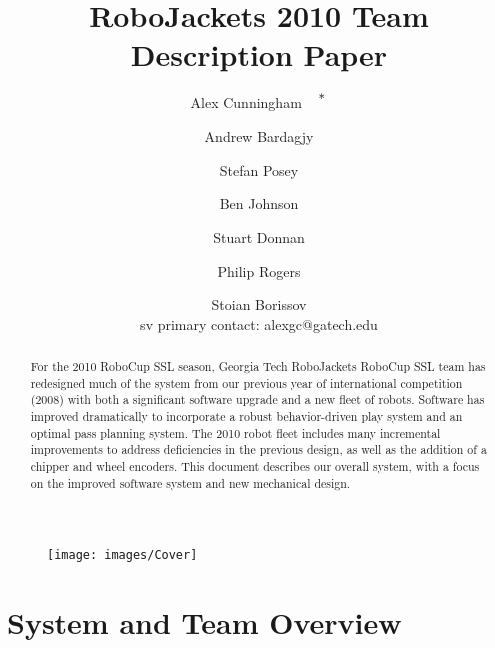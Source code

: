 \documentclass{llncs}
\title{RoboJackets 2010 Team Description Paper}
\author
{
Alex Cunningham  $^{\textrm{{\small *}}}$ \and
Andrew Bardagjy \and
Stefan Posey \and 
Ben Johnson \and
Stuart Donnan \and
Philip Rogers \and
Stoian Borissov
\\ sv
{\small * primary contact: alexgc@gatech.edu}
}
\institute{RoboJackets - www.robojackets.org \\ Georgia Institute of Technology - Atlanta, Georgia, USA.}
\begin{document}
\maketitle

\begin{figure} 
	\centering
	\vspace {0 cm}
 	\texttt{[image: images/Cover]}
\end{figure}

\begin{abstract}
For the 2010 RoboCup SSL season, Georgia Tech RoboJackets RoboCup SSL team has redesigned much of the system from our previous year of international competition (2008) with both a significant software upgrade and a new fleet of robots.  Software has improved dramatically to incorporate a robust behavior-driven play system and an optimal pass planning system.  The 2010 robot fleet includes many incremental improvements to address deficiencies in the previous design, as well as the addition of a chipper and wheel encoders.  This document describes our overall system, with a focus on the improved software system and new mechanical design.  
\end{abstract}

\newpage

\section{System and Team Overview}
\end{document}
